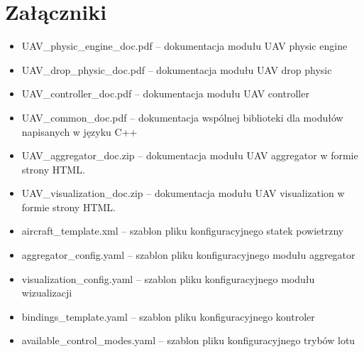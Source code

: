 \documentclass[15pt]{sprawozdanie}
\begin{document}

\newpage
\section{Załączniki}

\begin{itemize} %
\item UAV\_physic\_engine\_doc.pdf -- dokumentacja modułu UAV physic engine
\item UAV\_drop\_physic\_doc.pdf -- dokumentacja modułu UAV drop physic
\item UAV\_controller\_doc.pdf -- dokumentacja modułu UAV controller
\item UAV\_common\_doc.pdf -- dokumentacja wspólnej biblioteki dla modułów napisanych w języku C++
\item UAV\_aggregator\_doc.zip -- dokumentacja modułu UAV aggregator w formie strony HTML.
\item UAV\_visualization\_doc.zip -- dokumentacja modułu UAV visualization w formie strony HTML.

\item aircraft\_template.xml -- szablon pliku konfiguracyjnego statek powietrzny
\item aggregator\_config.yaml -- szablon pliku konfiguracyjnego modułu aggregator
\item visualization\_config.yaml -- szablon pliku konfiguracyjnego modułu wizualizacji
\item bindings\_template.yaml -- szablon pliku konfiguracyjnego kontroler
\item available\_control\_modes.yaml -- szablon pliku konfiguracyjnego trybów lotu
\end{itemize}
\end{document}

